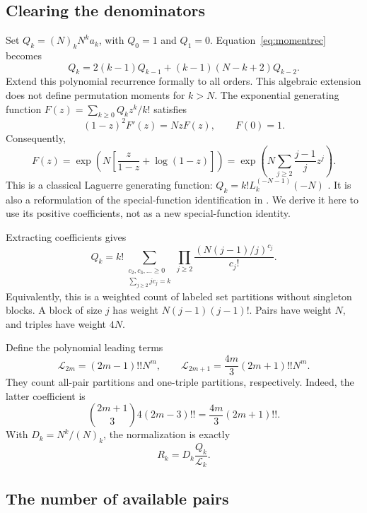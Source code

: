 \documentclass[11pt]{article}
\theoremstyle{definition}
\theoremstyle{remark}
\newcommand{\1}{\mathbf 1}
\begin{document}
\subsection{Clearing the denominators}

Set $Q_k=(N)_kN^ka_k$, with $Q_0=1$ and $Q_1=0$. Equation~\eqref{eq:momentrec} becomes
\begin{equation}\label{eq:qrec}
Q_k=2(k-1)Q_{k-1}+(k-1)(N-k+2)Q_{k-2}.
\end{equation}
Extend this polynomial recurrence formally to all orders. This algebraic extension does not define permutation moments for $k>N$. The exponential generating function $F(z)=\sum_{k\ge0}Q_kz^k/k!$ satisfies
\[
(1-z)^2F'(z)=NzF(z),\qquad F(0)=1.
\]
Consequently,
\begin{equation}\label{eq:egf}
F(z)=\exp\left(N\left[\frac z{1-z}+\log(1-z)\right]\right)
=\exp\left(N\sum_{j\ge2}\frac{j-1}{j}z^j\right).
\end{equation}
This is a classical Laguerre generating function: $Q_k=k!L_k^{(-N-1)}(-N)$ \cite[equations 18.5.12 and 18.12.13]{DLMF}. It is also a reformulation of the special-function identification in \cite[Remark 3.5]{CN}. We derive it here to use its positive coefficients, not as a new special-function identity.

Extracting coefficients gives
\begin{equation}\label{eq:partitions}
Q_k=k!\sum_{\substack{c_2,c_3,\ldots\ge0\\\sum_{j\ge2}jc_j=k}}
\prod_{j\ge2}\frac{(N(j-1)/j)^{c_j}}{c_j!}.
\end{equation}
Equivalently, this is a weighted count of labeled set partitions without singleton blocks. A block of size $j$ has weight $N(j-1)(j-1)!$. Pairs have weight $N$, and triples have weight $4N$.

Define the polynomial leading terms
\[
\mathcal L_{2m}=(2m-1)!!N^m,\qquad
\mathcal L_{2m+1}=\frac{4m}{3}(2m+1)!!N^m.
\]
They count all-pair partitions and one-triple partitions, respectively. Indeed, the latter coefficient is
\[
\binom{2m+1}{3}4(2m-3)!!=\frac{4m}{3}(2m+1)!!.
\]
With $D_k=N^k/(N)_k$, the normalization is exactly
\begin{equation}\label{eq:qnormalize}
R_k=D_k\frac{Q_k}{\mathcal L_k}.
\end{equation}

\subsection{The number of available pairs}
\end{document}
